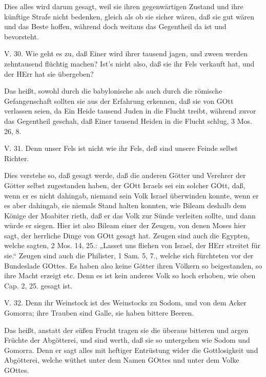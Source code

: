 Dies alles wird darum gesagt, weil sie ihren gegenwärtigen Zustand und ihre künftige Strafe nicht bedenken, gleich als ob sie sicher wären, daß sie gut wären und das Beste hoffen, während doch weitaus das Gegentheil da ist und bevorsteht.

\begin{schriftzitat}
V. 30. Wie geht es zu, daß Einer wird ihrer tausend jagen, und zween werden zehntausend flüchtig machen? Ist’s nicht also, daß sie ihr Fels verkauft hat, und der HErr hat sie übergeben?
\end{schriftzitat}

Das heißt, sowohl durch die babylonische als auch durch die römische Gefangenschaft sollten sie aus der Erfahrung erkennen, daß sie von GOtt verlassen seien, da Ein Heide tausend Juden in die Flucht treibt, während zuvor das Gegentheil geschah, daß Einer tausend Heiden in die Flucht schlug, 3 Mos. 26, 8.

\begin{schriftzitat}
V. 31. Denn unser Fels ist nicht wie ihr Fels, deß sind unsere Feinde selbst Richter.
\end{schriftzitat}

Dies verstehe so, daß gesagt werde, daß die anderen Götter und Verehrer der Götter selbst zugestanden haben, der GOtt Israels sei ein solcher GOtt, daß, wenn er es nicht dahingab, niemand sein Volk Israel überwinden konnte, wenn er es aber dahingab, sie niemals Stand halten konnten, wie Bileam deshalb dem Könige der Moabiter rieth, daß er das Volk zur Sünde verleiten sollte, und dann würde er siegen. Hier ist also Bileam einer der Zeugen,
von denen Moses hier sagt, der herrliche Dinge von GOtt gesagt hat. Zeugen sind auch die Egypten, welche sagten, 2 Mos. 14, 25.: „Lasset uns fliehen von Israel, der HErr streitet für sie.“ Zeugen sind auch die Philister, 1 Sam. 5, 7., welche sich fürchteten vor der Bundeslade GOttes. Es haben also keine Götter ihren Völkern so beigestanden, so ihre Macht erzeigt etc. Denn es ist kein anderes Volk so hoch erhoben, wie oben Cap. 2, 25. gesagt ist.

\begin{schriftzitat}
V. 32. Denn ihr Weinstock ist des Weinstocks zu Sodom, und von dem Acker Gomorra; ihre Trauben sind Galle, sie haben bittere Beeren.
\end{schriftzitat}

Das heißt, anstatt der süßen Frucht tragen sie die überaus bitteren und argen Früchte der Abgötterei, und sind werth, daß sie so untergehen wie Sodom und Gomorra. Denn er sagt alles mit heftiger Entrüstung wider die Gottlosigkeit und Abgötterei, welche wüthet unter dem Namen GOttes und unter dem Volke GOttes.

